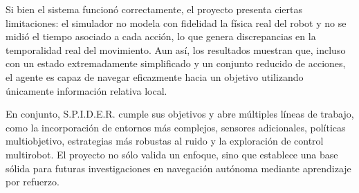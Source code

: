 \documentclass[conference]{IEEEtran}
\begin{document}
Si bien el sistema funcionó correctamente, el proyecto presenta ciertas limitaciones: el simulador no modela con fidelidad la física real del robot y no se midió el tiempo asociado a cada acción, lo que genera discrepancias en la temporalidad real del movimiento. Aun así, los resultados muestran que, incluso con un estado extremadamente simplificado y un conjunto reducido de acciones, el agente es capaz de navegar eficazmente hacia un objetivo utilizando únicamente información relativa local.

En conjunto, \textsc{S.P.I.D.E.R.} cumple sus objetivos y abre múltiples líneas de trabajo, como la incorporación de entornos más complejos, sensores adicionales, políticas multiobjetivo, estrategias más robustas al ruido y la exploración de control multirobot. El proyecto no sólo valida un enfoque, sino que establece una base sólida para futuras investigaciones en navegación autónoma mediante aprendizaje por refuerzo.



\end{document}
